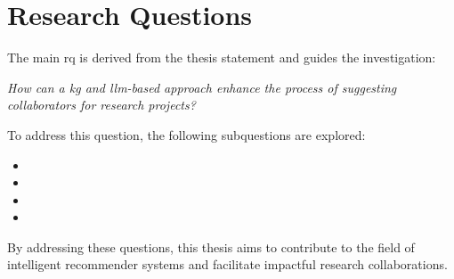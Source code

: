 \section{Research Questions}\label{sec:research-questions}
The main \gls{rq} is derived from the thesis statement and guides the investigation:
\begin{center}
	\textit{How can a \gls{kg} and \gls{llm}-based approach enhance the process of suggesting collaborators for research projects?}
\end{center}

To address this question, the following subquestions are explored:
\begin{itemize}
	\item \rqOne
	\item \rqTwo
	\item \rqThree
	\item \rqFour
\end{itemize}


By addressing these questions, this thesis aims to contribute to the field of intelligent recommender systems and facilitate impactful research collaborations.

